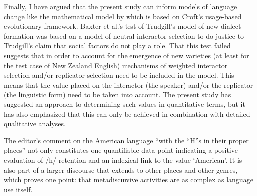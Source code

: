 Finally, I have argued that the present study can inform models of language change like the mathematical model by  which is based on Croft’s usage-based evolutionary framework. Baxter et al.’s test of Trudgill’s model of new-dialect formation was based on a model of neutral interactor selection to do justice to Trudgill’s claim that social factors do not play a role. That this test failed suggests that in order to account for the emergence of new varieties (at least for the test case of New Zealand English) mechanisms of weighted interactor selection and/or replicator selection need to be included in the model. This means that the value placed on the interactor (the speaker) and/or the replicator (the linguistic form) need to be taken into account. The present study has suggested an approach to determining such values in quantitative terms, but it has also emphasized that this can only be achieved in combination with detailed qualitative analyses.

The editor’s comment on the American language “with the “H”s in their proper places” not only constitutes one quantifiable data point indicating a positive evaluation of /h/-retention and an indexical link to the value ‘American’. It is also part of a larger discourse that extends to other places and other genres, which proves one point: that metadiscursive activities are as complex as language use itself.

